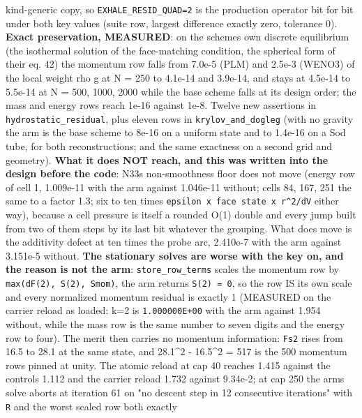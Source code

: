 \documentclass[english,a4paper]{my_memo}
\begin{document}
\begin{itemize}
  kind-generic copy, so \texttt{EXHALE\_RESID\_QUAD=2} is the production operator
  bit for bit under both key values (suite row, largest difference exactly
  zero, tolerance 0). \textbf{Exact preservation, MEASURED}: on the scheme\textquotesingle s own
  discrete equilibrium (the isothermal solution of the face-matching
  condition, the spherical form of their eq. 42) the momentum row falls
  from 7.0e-5 (PLM) and 2.5e-3 (WENO3) of the local weight rho g at
  N = 250 to 4.1e-14 and 3.9e-14, and stays at 4.5e-14 to 5.5e-14 at
  N = 500, 1000, 2000 while the base scheme falls at its design order; the
  mass and energy rows reach 1e-16 against 1e-8. Twelve new assertions in
  \texttt{hydrostatic\_residual}, plus eleven rows in \texttt{krylov\_and\_dogleg} (with no
  gravity the arm is the base scheme to 8e-16 on a uniform state and to
  1.4e-16 on a Sod tube, for both reconstructions; and the same exactness
  on a second grid and geometry). \textbf{What it does NOT reach, and this was
  written into the design before the code}: N33\textquotesingle s non-smoothness floor
  does not move (energy row of cell 1, 1.009e-11 with the arm against
  1.046e-11 without; cells 84, 167, 251 the same to a factor 1.3; six to
  ten times \texttt{epsilon\ x\ face\ state\ x\ r\^{}2/dV} either way), because a cell
  pressure is itself a rounded O(1) double and every jump built from two of
  them steps by its last bit whatever the grouping. What does move is the
  additivity defect at ten times the probe arc, 2.410e-7 with the arm
  against 3.151e-5 without. \textbf{The stationary solves are worse with the key
  on, and the reason is not the arm}: \texttt{store\_row\_terms} scales the
  momentum row by \texttt{max(\textbar{}dF(2)\textbar{},\ \textbar{}S(2)\textbar{},\ \textbar{}Smom\textbar{})}, the arm returns
  \texttt{S(2)\ =\ 0}, so the row IS its own scale and every normalized momentum
  residual is exactly 1 (MEASURED on the carrier reload as loaded: k=2 is
  \texttt{1.000000E+00} with the arm against 1.954 without, while the mass row is
  the same number to seven digits and the energy row to four). The merit
  then carries no momentum information: \texttt{\textbar{}\textbar{}Fs\textbar{}\textbar{}2} rises from 16.5 to 28.1
  at the same state, and 28.1\^{}2 - 16.5\^{}2 = 517 is the 500 momentum rows
  pinned at unity. The atomic reload at cap 40 reaches 1.415 against the
  control\textquotesingle s 1.112 and the carrier reload 1.732 against 9.34e-2; at cap 250
  the arm\textquotesingle s solve aborts at iteration 61 on "no descent step in 12
  consecutive iterations" with \texttt{\textbar{}\textbar{}R\textbar{}\textbar{}} and the worst scaled row both exactly

\end{itemize}
\end{document}
